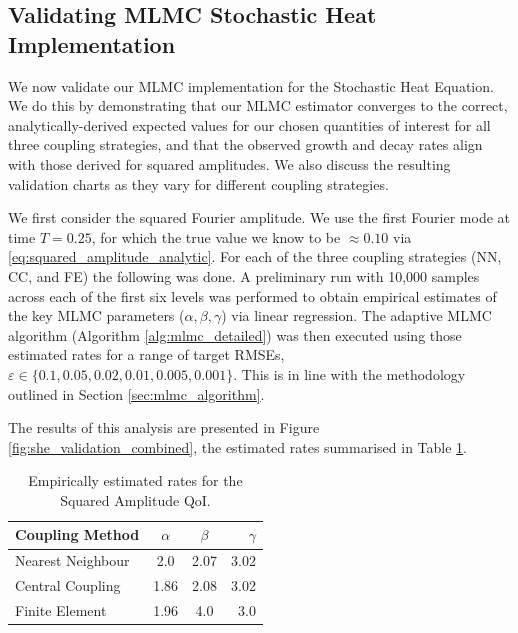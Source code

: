 \subsection{Validating MLMC Stochastic Heat Implementation}\label{sec:stoch_heat_validation}

We now validate our MLMC implementation for the Stochastic Heat Equation.
We do this by demonstrating that our MLMC estimator converges to the correct, 
analytically-derived expected values for our chosen quantities of interest for
all three coupling strategies, and that the observed 
growth and decay rates align with those derived for squared amplitudes. 
We also discuss the resulting validation charts as they vary for different coupling 
strategies.

We first consider the squared Fourier amplitude. We use the first Fourier mode
at time $T = 0.25$, for which the true value we know to 
be $\approx 0.10$
via \eqref{eq:squared_amplitude_analytic}.
For each of the three coupling strategies (NN, CC, and FE) the following was done. 
A preliminary run with 10,000 samples across each of 
the first six levels was performed to obtain 
empirical estimates of the key MLMC 
parameters ($\alpha, \beta, \gamma$) via linear regression. 
The adaptive MLMC algorithm (Algorithm \ref{alg:mlmc_detailed}) was then 
executed using those estimated rates for a range of 
target RMSEs, $\varepsilon \in \{0.1, 0.05, 0.02, 0.01, 0.005, 0.001\}$. 
This is in line with the methodology outlined in Section
\ref{sec:mlmc_algorithm}.

The results of this analysis are presented in Figure \ref{fig:she_validation_combined}, 
the estimated rates summarised in Table \ref{tab:she_decay_rates}.

\begin{table}[htbp]
    \centering
    \begin{tabular}{|l|c|c|r|}
        \hline
        \textbf{Coupling Method} & \textbf{$\alpha$} & \textbf{$\beta$} & \textbf{$\gamma$} \\
        \hline
        Nearest Neighbour & 2.0 & 2.07 & 3.02\\
        Central Coupling & 1.86 & 2.08 & 3.02 \\
        Finite Element & 1.96 & 4.0 & 3.0 \\
        \hline
    \end{tabular}
    \caption{Empirically estimated rates for the Squared Amplitude QoI.}
    \label{tab:she_decay_rates}
\end{table}

